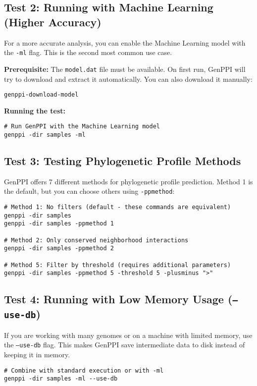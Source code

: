 \documentclass[11pt, a4paper]{article}
\begin{document}
\subsection{Test 2: Running with Machine Learning (Higher Accuracy)}
For a more accurate analysis, you can enable the Machine Learning model with the \texttt{-ml} flag. This is the second most common use case.

\textbf{Prerequisite:} The \texttt{model.dat} file must be available. On first run, GenPPI will try to download and extract it automatically. You can also download it manually:
\begin{lstlisting}[style=bashstyle]
genppi-download-model
\end{lstlisting}
\textbf{Running the test:}
\begin{lstlisting}[style=bashstyle]
# Run GenPPI with the Machine Learning model
genppi -dir samples -ml
\end{lstlisting}

\subsection{Test 3: Testing Phylogenetic Profile Methods}
GenPPI offers 7 different methods for phylogenetic profile prediction. Method 1 is the default, but you can choose others using \texttt{-ppmethod}:
\begin{lstlisting}[style=bashstyle]
# Method 1: No filters (default - these commands are equivalent)
genppi -dir samples
genppi -dir samples -ppmethod 1

# Method 2: Only conserved neighborhood interactions
genppi -dir samples -ppmethod 2

# Method 5: Filter by threshold (requires additional parameters)
genppi -dir samples -ppmethod 5 -threshold 5 -plusminus ">"
\end{lstlisting}

\subsection{Test 4: Running with Low Memory Usage (\texttt{--use-db})}
If you are working with many genomes or on a machine with limited memory, use the \texttt{--use-db} flag. This makes GenPPI save intermediate data to disk instead of keeping it in memory.
\begin{lstlisting}[style=bashstyle]
# Combine with standard execution or with -ml
genppi -dir samples -ml --use-db
\end{lstlisting}
\end{document}
